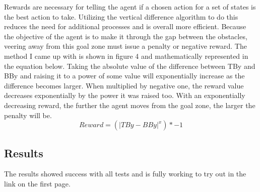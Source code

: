 \documentclass{article}
\begin{document}
Rewards are necessary for telling the agent if a chosen action for a set of states is the best action to take. Utilizing the vertical difference algorithm to do this reduces the need for additional processes and is overall more efficient. Because the objective of the agent is to make it through the gap between the obstacles, veering away from this goal zone must issue a penalty or negative reward. The method I came up with is shown in figure 4 and mathematically represented in the equation below. Taking the absolute value of the difference between TBy and BBy and raising it to a power of some value will exponentially increase as the difference becomes larger. When multiplied by negative one, the reward value decreases exponentially by the power it was raised too. With an exponentially decreasing reward, the further the agent moves from the goal zone, the larger the penalty will be.
\begin{equation}
Reward = (|TBy-BBy|^{x}) * -1
\end{equation}

\subsection{Results}
The results showed success with all tests and is fully working to try out in the link on the first page.




%
%
%
%
%
%
%
%
\end{document}
